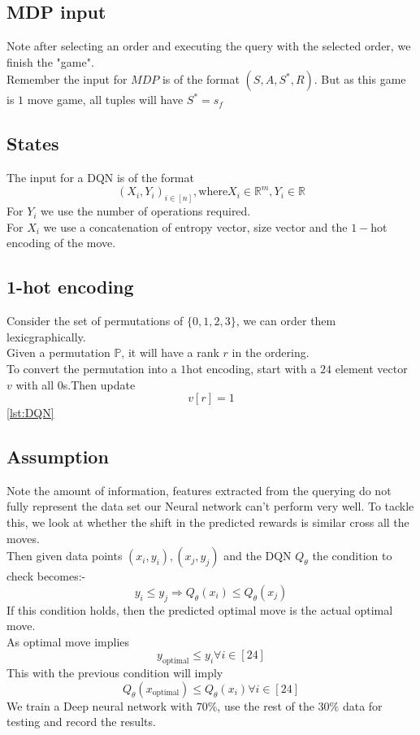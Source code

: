 \subsection{MDP input}
Note after selecting an order and executing the query with the selected order, we finish the "game".\\
Remember the input for $MDP$ is of the format $(S,A,S^{*},R)$. But as this game is $1$ move game, all tuples will have $S^{*}=s_{f}$

\subsection{States}
The input for a DQN is of the format 
$$(X_{i},Y_{i})_{i\in[n]}, \text{where} X_{i}\in \mathbb{R}^{m}, Y_{i}\in \mathbb{R}$$
For $Y_{i}$ we use the number of operations required.\\
For $X_{i}$ we use a concatenation of entropy vector, size vector and the $1-$hot encoding of the move.

\subsection{1-hot encoding}
Consider the set of permutations of $\{0,1,2,3\}$, we can order them lexicgraphically.\\
Given a permutation $\mathbb{P}$, it will have a rank $r$ in the ordering.\\
To convert the permutation into a $1$hot encoding, start with a $24$ element vector $v$ with all $0$s.Then update 
$$v[r]=1$$
\ref{lst:DQN}

\subsection{Assumption}
Note the amount of information, features extracted from the querying do not fully represent the data set our Neural network can't perform very well. To tackle this, we look at whether the shift in the predicted rewards is similar cross all the moves.\\
Then given data points $(x_{i},y_{i}),(x_{j},y_{j})$ and the DQN $Q_{\theta}$ the condition to check becomes:-
$$y_{i}\leq y_{j}\Rightarrow Q_{\theta}(x_{i})\leq Q_{\theta}(x_{j})$$
If this condition holds, then the predicted optimal move is the actual optimal move. \\
As optimal move implies
$$y_{\text{optimal}}\leq y_{i} \forall i \in [24]$$
This with the previous condition will imply
$$Q_{\theta}(x_{\text{optimal}})\leq Q_{\theta}(x_{i})\forall i \in [24]$$ 
We train a Deep neural network with $70\%$, use the rest of the $30\%$ data for testing and record the results.


